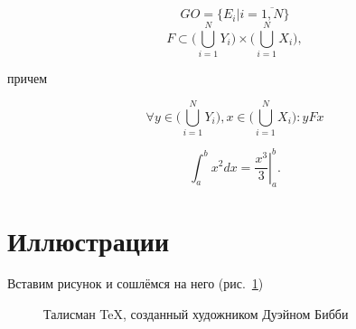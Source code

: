 \documentclass[12pt]{article}
\begin{document}
\[
	GO = \{ E_{i}|i = \overline{1,N}\}
\]
\[
	F \subset  \Bigg( \bigcup_{i=1}^{N}Y_{i}       \Bigg)  \times \Bigg( \bigcup_{i=1}^{N}X_{i}       \Bigg), 
\]

причем

\[
	\forall y  \in  \Bigg( \bigcup_{i=1}^{N}Y_{i}       \Bigg), x \in  \Bigg( \bigcup_{i=1}^{N}X_{i} \Bigg): yFx
\]
	

\[
\int_a^b x^2 dx = \left. \frac{x^3}{3} \right|_a^b .
\]

\section{Иллюстрации}

Вставим рисунок и сошлёмся на него (рис.~\ref{lion})

\begin{figure}[h]
\caption{Талисман \TeX, созданный художником Дуэйном Бибби}
\label{lion}
\end{figure}
\end{document}
